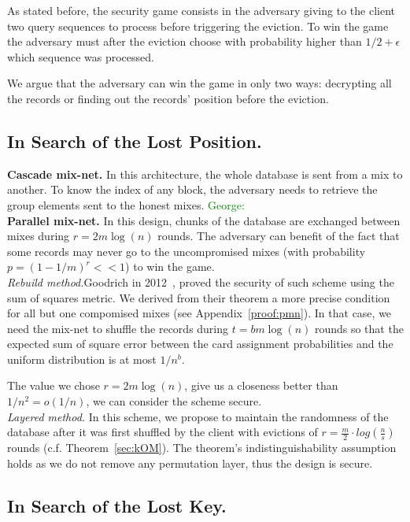 \documentclass[USenglish,oneside,twocolumn]{article}
\newcommand{\george}[1]{\textcolor{green}{George: #1}}
\begin{document}
As stated before, the security game consists in the adversary giving to the client two query sequences to process before triggering the eviction. To win the game the adversary must after the eviction choose with probability higher than $1/2 +\epsilon$ which sequence was processed.

We argue that the adversary can win the game in only two ways: decrypting all the records or finding out the records' position before the eviction. 

\subsection{In Search of the Lost Position.}

\noindent\textbf{Cascade mix-net.}
In this architecture, the whole database is sent from a mix to another. To know the index of any block, the adversary needs to retrieve the group elements sent to the honest mixes. \george{} \\

\noindent\textbf{Parallel mix-net.}
In this design, chunks of the database are exchanged between mixes during $r=2m\log(n)$ rounds. The adversary can benefit of the fact that some records may never go to the uncompromised mixes (with probability $p=(1-1/m)^r << 1$) to win the game.\\

\noindent\textit{Rebuild method.}Goodrich in 2012~\cite{goodrich2012anonymous}, proved the security of such scheme using the sum of squares metric. We derived from their theorem a more precise condition for all but one compomised mixes (see Appendix~\ref{proof:pmn}). In that case, we need the mix-net  to shuffle the records during $t=bm\log(n)$ rounds so that the expected sum of square error between the card assignment probabilities and the uniform distribution is at most $1/n^b$.

The value we chose $r=2m\log(n)$, give us a closeness better than $1/n^2 = o(1/n)$, we can consider the scheme secure.\\

\noindent\textit{Layered method.}
In this scheme, we propose to maintain the randomness of the database after it was first shuffled by the client with evictions of $r=\frac{m}{2} \cdot log\left ( \frac{n}{s} \right )$ rounds (c.f. Theorem~\ref{sec:kOM}).
The theorem's indistinguishability assumption holds as we do not remove any permutation layer, thus the design is secure.

\subsection{In Search of the Lost Key.}
 
\end{document}
